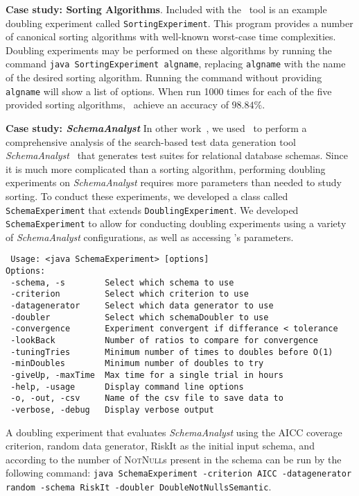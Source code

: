     \lstset{language=bash}

    {\bf Case study: Sorting Algorithms}.  Included with the
    \toolname~tool is an example doubling experiment called
    \texttt{SortingExperiment}.  This program provides a number of
    canonical sorting algorithms with well-known worst-case time
    complexities.  Doubling experiments may be performed on these
    algorithms by running the command \texttt{java SortingExperiment
    algname}, replacing \texttt{algname} with the name of the desired
    sorting algorithm. Running the command without providing
    \texttt{algname} will show a list of options. When run 1000 times
    for each of the five provided sorting algorithms, \toolname~achieve
    an accuracy of $98.84\%$.

    {\bf Case study: \textit{SchemaAnalyst}} In other
    work~\cite{kinneer2015}, we used \toolname~to perform a
    comprehensive analysis of the search-based test data generation tool
    \textit{SchemaAnalyst}~\cite{kapfhammer2013} that generates test
    suites for relational database schemas. Since it is much more
    complicated than a sorting algorithm, performing doubling
    experiments on \textit{SchemaAnalyst} requires more parameters than
    needed to study sorting.  To conduct these experiments, we
    developed a class called \texttt{SchemaExperiment} that extends
    \texttt{DoublingExperiment}.  We developed \texttt{SchemaExperiment}
    to allow for conducting doubling experiments using a variety of
    \textit{SchemaAnalyst} configurations, as well as accessing
    \toolname's parameters.

{\scriptsize
\begin{verbatim}
 Usage: <java SchemaExperiment> [options]
Options:
 -schema, -s        Select which schema to use
 -criterion         Select which criterion to use
 -datagenerator     Select which data generator to use
 -doubler           Select which schemaDoubler to use
 -convergence       Experiment convergent if differance < tolerance
 -lookBack          Number of ratios to compare for convergence
 -tuningTries       Minimum number of times to doubles before O(1)
 -minDoubles        Minimum number of doubles to try
 -giveUp, -maxTime  Max time for a single trial in hours
 -help, -usage      Display command line options
 -o, -out, -csv     Name of the csv file to save data to
 -verbose, -debug   Display verbose output
\end{verbatim}
}

    A doubling experiment that evaluates \textit{SchemaAnalyst} using
    the AICC coverage criterion, random data generator, RiskIt as the initial input
    schema, and according to the number of \textsc{NotNull}s present in the
    schema can be run by the following command:
    \texttt{java SchemaExperiment -criterion AICC -datagenerator random
    -schema RiskIt -doubler DoubleNotNullsSemantic}.

